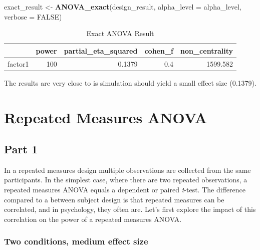 \documentclass[]{book}
\newenvironment{Shaded}{\begin{snugshade}}{\end{snugshade}}
\newcommand{\DataTypeTok}[1]{\textcolor[rgb]{0.13,0.29,0.53}{#1}}
\newcommand{\KeywordTok}[1]{\textcolor[rgb]{0.13,0.29,0.53}{\textbf{#1}}}
\newcommand{\NormalTok}[1]{#1}
\newcommand{\OtherTok}[1]{\textcolor[rgb]{0.56,0.35,0.01}{#1}}
\newcommand{\StringTok}[1]{\textcolor[rgb]{0.31,0.60,0.02}{#1}}
\begin{document}
\begin{Shaded}
\begin{Highlighting}[]
\NormalTok{exact_result <-}\StringTok{ }\KeywordTok{ANOVA_exact}\NormalTok{(design_result,}
                            \DataTypeTok{alpha_level =}\NormalTok{ alpha_level,}
                            \DataTypeTok{verbose =} \OtherTok{FALSE}\NormalTok{)}
\end{Highlighting}
\end{Shaded}

\begin{table}[!h]

\caption{\label{tab:unnamed-chunk-94}Exact ANOVA Result}
\centering
\begin{tabular}{l|r|r|r|r}
\hline
  & power & partial\_eta\_squared & cohen\_f & non\_centrality\\
\hline
factor1 & 100 & 0.1379 & 0.4 & 1599.582\\
\hline
\end{tabular}
\end{table}

The results are very close to is simulation should yield a small effect size (0.1379).

\hypertarget{repeated-measures-anova}{%
\chapter{Repeated Measures ANOVA}\label{repeated-measures-anova}}

\hypertarget{part-1-1}{%
\section{Part 1}\label{part-1-1}}

In a repeated measures design multiple observations are collected from the same participants. In the simplest case, where there are two repeated observations, a repeated measures ANOVA equals a dependent or paired \emph{t}-test. The difference compared to a between subject design is that repeated measures can be correlated, and in psychology, they often are. Let's first explore the impact of this correlation on the power of a repeated measures ANOVA.

\hypertarget{two-conditions-medium-effect-size}{%
\subsection{Two conditions, medium effect size}\label{two-conditions-medium-effect-size}}
\end{document}
